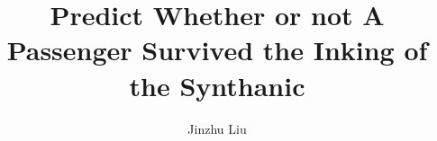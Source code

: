 \documentclass{amsart}
\begin{document}
%
%
\title[A Short Running Title]{Predict Whether or not A Passenger Survived the Inking of the Synthanic}%

\author{Jinzhu Liu}
\address[A.~1]{Nanjing University of Science and Technology, China}%

\date{\gitAuthorDate}%


\maketitle
\tableofcontents

\newpage



\newpage

\listoftodos
\end{document}
